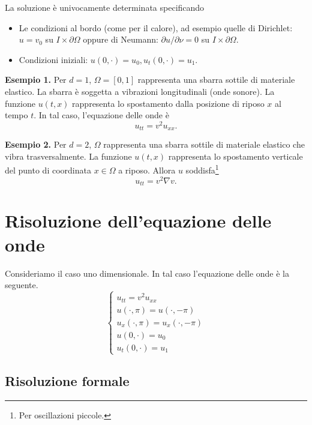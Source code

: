 La soluzione è univocamente determinata specificando

\begin{itemize}

	\item Le condizioni al bordo (come per il calore), ad esempio quelle di Dirichlet: $u = v_0$ su $I \times \partial \Omega$ oppure di Neumann: $\partial u / \partial \nu = 0$ su $I \times \partial \Omega$.


	\item Condizioni iniziali: $u(0,\cdot) = u_0, u_t(0,\cdot) = u_1$.

\end{itemize}

\textbf{Esempio 1.} Per $d = 1$, $\Omega = [0,1]$ rappresenta una sbarra sottile di materiale elastico. La sbarra è soggetta a vibrazioni longitudinali (onde sonore).
La funzione $u(t,x)$ rappresenta lo spostamento dalla posizione di riposo $x$ al tempo $t$.
In tal caso, l'equazione delle onde è
%
$$
	u_{tt} = v^2 u_{xx}.
$$
%


\textbf{Esempio 2.} Per $d=2$, $\Omega$ rappresenta una sbarra sottile di materiale elastico che vibra trasversalmente. La funzione $u(t,x)$ rappresenta lo spostamento verticale del punto di coordinata $x \in \Omega$ a riposo. Allora $u$ soddisfa\footnote{Per oscillazioni piccole.}
%
$$
	u_{tt} = v^2 \nabla v.
$$
%


\section{Risoluzione dell'equazione delle onde}

Consideriamo il caso uno dimensionale. In tal caso l'equazione delle onde è la seguente.
%
\begin{equation}
\tag{P} \label{eq:17nov2021_problem_1}
\begin{cases}
	u_{tt} = v^2 u_{xx} \\
	u(\cdot, \pi) = u(\cdot, -\pi) \\
	u_x(\cdot, \pi) = u_x(\cdot, -\pi) \\
	u(0,\cdot) = u_0 \\
	u_t(0,\cdot) = u_1
\end{cases} 
\end{equation}

\subsection{Risoluzione formale}

